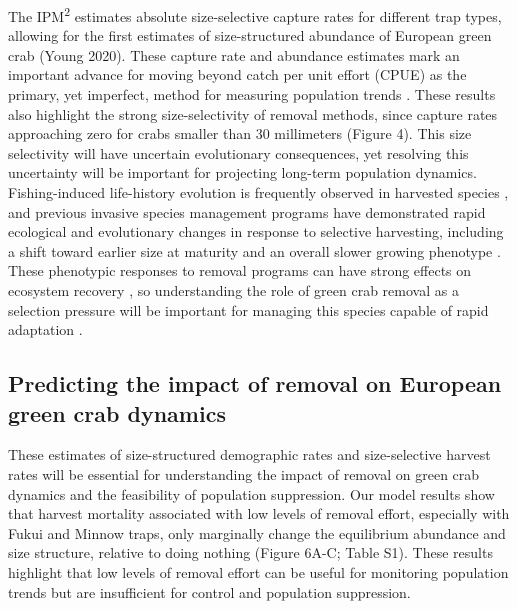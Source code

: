 \documentclass{article}
\begin{document}
The IPM\textsuperscript{2} estimates absolute size-selective capture rates for different trap types, allowing for the first estimates of size-structured abundance of European green crab (Young 2020). These capture rate and abundance estimates mark an important advance for moving beyond catch per unit effort (CPUE) as the primary, yet imperfect, method for measuring population trends \parencite{harley2001catch}. These results also highlight the strong size-selectivity of removal methods, since capture rates approaching zero for crabs smaller than 30 millimeters (Figure 4). This size selectivity will have uncertain evolutionary consequences, yet resolving this uncertainty will be important for projecting long-term population dynamics. Fishing-induced life-history evolution is frequently observed in harvested species \parencite{enberg2012fishing}, and previous invasive species management programs have demonstrated rapid ecological and evolutionary changes in response to selective harvesting, including a shift toward earlier size at maturity and an overall slower growing phenotype \parencite{evangelista2015impacts}. These phenotypic responses to removal programs can have strong effects on ecosystem recovery \parencite{zavorka2020phenotypic}, so understanding the role of green crab removal as a selection pressure will be important for managing this species capable of rapid adaptation \parencite{tepolt2020rapid}.


\subsection{Predicting the impact of removal on European green crab dynamics}

These estimates of size-structured demographic rates and size-selective harvest rates will be essential for understanding the impact of removal on green crab dynamics and the feasibility of population suppression. Our model results show that harvest mortality associated with low levels of removal effort, especially with Fukui and Minnow traps, only marginally change the equilibrium abundance and size structure, relative to doing nothing (Figure 6A-C; Table S1). These results highlight that low levels of removal effort can be useful for monitoring population trends but are insufficient for control and population suppression.
\end{document}
